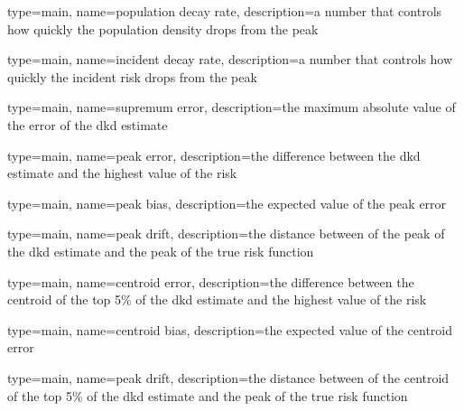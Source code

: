 

{%
   type=main,
   name={population decay rate},
   description={a number that controls how quickly the population density drops from the peak}
}

{%
   type=main,
   name={incident decay rate},
   description={a number that controls how quickly the incident risk drops from the peak}
}

{%
   type=main,
   name={supremum error},
   description={the maximum absolute value of the error of the dkd estimate}
}

{%
   type=main,
   name={peak error},
   description={the difference between the dkd estimate and the highest value of the risk}
}

{%
   type=main,
   name={peak bias},
   description={the expected value of the peak error}
}

{%
   type=main,
   name={peak drift},
   description={the distance between of the peak of the dkd estimate and the peak of the true risk function}
}

{%
   type=main,
   name={centroid error},
   description={the difference between the centroid of the top 5\% of the dkd estimate and the highest value of the risk}
}

{%
   type=main,
   name={centroid bias},
   description={the expected value of the centroid error}
}

{%
   type=main,
   name={peak drift},
   description={the distance between of the centroid of the top 5\% of the dkd estimate and the peak of the true risk function}
}



